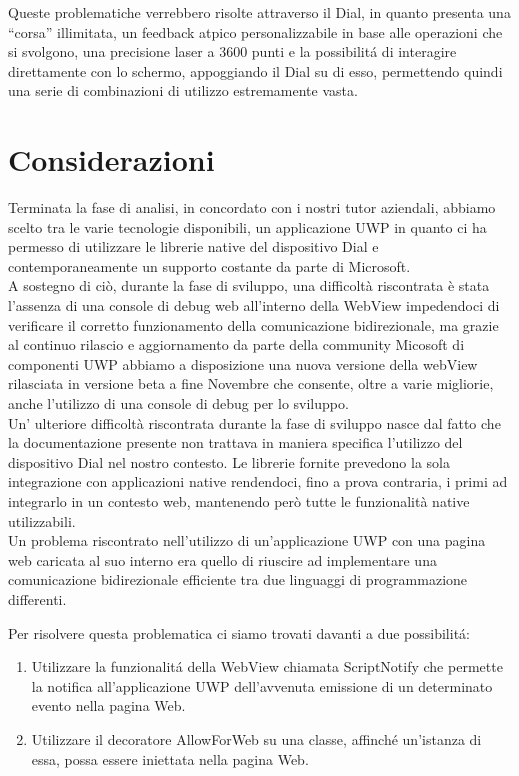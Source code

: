 Queste problematiche verrebbero risolte attraverso il Dial, in quanto presenta una “corsa” illimitata, un feedback atpico personalizzabile in base alle operazioni che si svolgono, una precisione laser a 3600 punti e la possibilitá di interagire direttamente con lo schermo, appoggiando il Dial su di esso, permettendo quindi una serie di combinazioni di utilizzo estremamente vasta.

\section{Considerazioni}
Terminata la fase di analisi, in concordato con i nostri tutor aziendali, abbiamo scelto tra le varie tecnologie disponibili, un applicazione UWP in quanto ci ha permesso di utilizzare le librerie native del dispositivo Dial e contemporaneamente un supporto costante da parte di Microsoft.\\

A sostegno di ciò, durante la fase di sviluppo, una difficoltà riscontrata è stata l'assenza di una console di debug web all'interno della WebView impedendoci di verificare il corretto funzionamento della comunicazione bidirezionale, ma grazie al continuo rilascio e aggiornamento da parte della community Micosoft di componenti UWP abbiamo a disposizione una nuova versione della webView rilasciata in versione beta a fine Novembre che consente, oltre a varie migliorie, anche l'utilizzo di una console di debug per lo sviluppo.\\

Un' ulteriore difficoltà riscontrata durante la fase di sviluppo nasce dal fatto che la documentazione presente non trattava in maniera specifica l'utilizzo del dispositivo Dial nel nostro contesto.
Le librerie fornite prevedono la sola integrazione con applicazioni native rendendoci, fino a prova contraria, i primi ad integrarlo in un contesto web, mantenendo però tutte le funzionalità native utilizzabili.\\

Un problema riscontrato nell'utilizzo di un'applicazione UWP con una pagina web caricata al suo interno era quello di riuscire ad implementare una comunicazione bidirezionale efficiente tra due linguaggi di programmazione differenti.

Per risolvere questa problematica ci siamo trovati davanti a due possibilitá:

\begin{enumerate}
\item Utilizzare la funzionalitá della WebView chiamata ScriptNotify che permette la notifica all'applicazione UWP dell'avvenuta emissione di un determinato evento nella pagina Web.
\item Utilizzare il decoratore AllowForWeb su una classe, affinché un'istanza di essa, possa essere iniettata nella pagina Web.
\end{enumerate}

